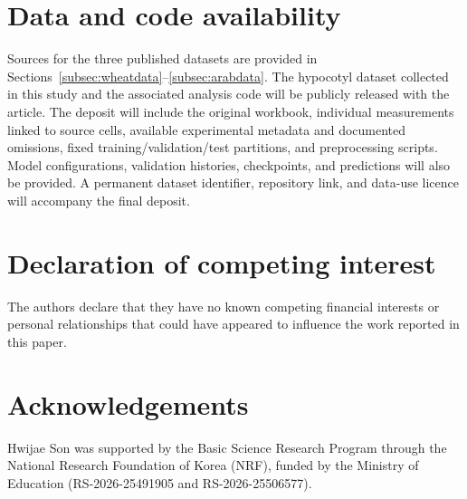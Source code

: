 \documentclass[preprint,12pt,authoryear]{elsarticle}
\begin{document}
\section*{Data and code availability}
Sources for the three published datasets are provided in Sections~\ref{subsec:wheatdata}--\ref{subsec:arabdata}. The hypocotyl dataset collected in this study and the associated analysis code will be publicly released with the article. The deposit will include the original workbook, individual measurements linked to source cells, available experimental metadata and documented omissions, fixed training/validation/test partitions, and preprocessing scripts. Model configurations, validation histories, checkpoints, and predictions will also be provided. A permanent dataset identifier, repository link, and data-use licence will accompany the final deposit.

\section*{Declaration of competing interest}
The authors declare that they have no known competing financial interests or personal relationships that could have appeared to influence the work reported in this paper.

\section*{Acknowledgements}
Hwijae Son was supported by the Basic Science Research Program through the National Research Foundation of Korea (NRF), funded by the Ministry of Education (RS-2026-25491905 and RS-2026-25506577).



\end{document}
